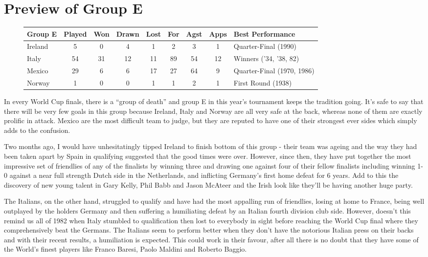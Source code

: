 \chapter{Preview of Group E}
\newline
\newline
\begin{figure}[H]
\small
\begin{tabular}{l c c c c c c c l}
Group E & Played & Won & Drawn & Lost & For & Agst & Apps & Best Performance\\ \hline
Ireland & 5 & 0 & 4 & 1 & 2 & 3 & 1 & Quarter-Final (1990) \\
Italy & 54 & 31 & 12 & 11 & 89 & 54 & 12 & Winners ('34, '38, 82) \\
Mexico & 29 & 6 & 6 & 17 & 27 & 64 & 9 & Quarter-Final (1970, 1986) \\
Norway & 1 & 0 & 0 & 1 & 1 & 2 & 1 & First Round (1938) \\
\end{tabular}
\normalsize
\end{figure}
In every World Cup finals, there is a ``group of death'' and group E in this 
year's tournament keeps the tradition going. It's safe to say that there will 
be very few goals in this group because Ireland, Italy and Norway are all very 
safe at the back, whereas none of them are exactly prolific in attack. Mexico 
are the most difficult team to judge, but they are reputed to have one of their
strongest ever sides which simply adds to the confusion.

Two months ago, I would have unhesitatingly tipped Ireland to finish bottom of
this group - their team was ageing and the way they had been taken apart by 
Spain in qualifying suggested that the good times were over. However, since 
then, they have put together the most impressive set of friendlies of any of 
the finalists by winning three and drawing one against four of their fellow
finalists including winning 1-0 against a near full strength Dutch side in the
Netherlands, and inflicting Germany's first home defeat for 6 years. Add to 
this the discovery of new young talent in Gary Kelly, Phil Babb and Jason 
McAteer and the Irish look like they'll be having another huge party.

The Italians, on the other hand, struggled to qualify and have had the most
appalling run of friendlies, losing at home to France, being well outplayed
by the holders Germany and then suffering a humiliating defeat by an Italian
fourth division club side. However, doesn't this remind us all of 1982 when
Italy stumbled to qualification then lost to everybody in sight before reaching
the World Cup final where they comprehensively beat the Germans. The Italians
seem to perform better when they don't have the notorious Italian press 
on their backs and with their recent results, a humiliation is expected. This 
could work in their favour, after all there is no doubt that they have some of 
the World's finest players like Franco Baresi, Paolo Maldini and Roberto 
Baggio.  

